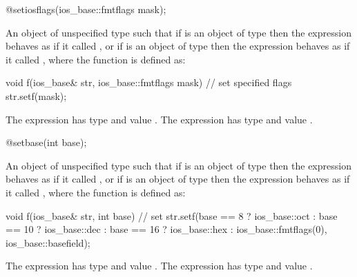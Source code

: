 %
\begin{itemdecl}
@\unspec@ setiosflags(ios_base::fmtflags mask);
\end{itemdecl}

\begin{itemdescr}
\pnum
\returns
An object of unspecified type such that if
is an object of type
then the expression
behaves as if it called
,
or if
is an object of type
then the expression
behaves as if it called
, where the function  is defined as:
%

\begin{codeblock}
void f(ios_base& str, ios_base::fmtflags mask) {
  // set specified flags
  str.setf(mask);
}
\end{codeblock}

The expression
has type
and value
.
The expression
has type
and value
.
\end{itemdescr}

%
\begin{itemdecl}
@\unspec@ setbase(int base);
\end{itemdecl}

\begin{itemdescr}
\pnum
\returns
An object of unspecified type such that if
is an object of type
then the expression
behaves as if it called
,
or if
is an object of type
then the expression
behaves as if it called
, where the function  is defined as:

\begin{codeblock}
void f(ios_base& str, int base) {
  // set 
  str.setf(base ==  8 ? ios_base::oct :
      base == 10 ? ios_base::dec :
      base == 16 ? ios_base::hex :
      ios_base::fmtflags(0), ios_base::basefield);
}
\end{codeblock}

The expression
has type
and value
.
The expression
has type
and value
.
\end{itemdescr}


